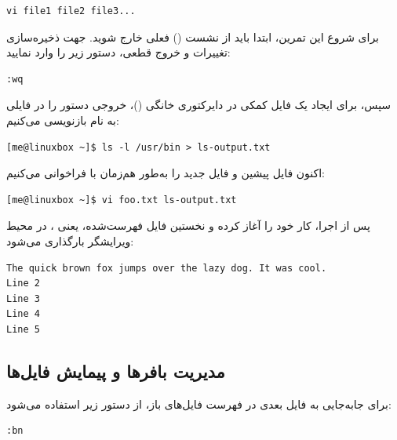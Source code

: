 \begin{latin}
\begin{lstlisting}
vi file1 file2 file3...
\end{lstlisting}
\end{latin}

برای شروع این تمرین، ابتدا باید از نشست () فعلی  خارج شوید. جهت ذخیره‌سازی تغییرات و خروج قطعی، دستور زیر را وارد نمایید:

\begin{latin}
\begin{lstlisting}
:wq
\end{lstlisting}
\end{latin}

سپس، برای ایجاد یک فایل کمکی در دایرکتوری خانگی ()، خروجی دستور  را در فایلی به نام  بازنویسی می‌کنیم:

\begin{latin}
\begin{lstlisting}
[me@linuxbox ~]$ ls -l /usr/bin > ls-output.txt
\end{lstlisting}
\end{latin}

اکنون فایل پیشین و فایل جدید را به‌طور هم‌زمان با  فراخوانی می‌کنیم:

\begin{latin}
\begin{lstlisting}
[me@linuxbox ~]$ vi foo.txt ls-output.txt
\end{lstlisting}
\end{latin}

پس از اجرا،  کار خود را آغاز کرده و نخستین فایل فهرست‌شده، یعنی ، در محیط ویرایشگر بارگذاری می‌شود:

\begin{latin}
\begin{lstlisting}
The quick brown fox jumps over the lazy dog. It was cool.
Line 2
Line 3
Line 4
Line 5
\end{lstlisting}
\end{latin}

\subsection{مدیریت بافرها و پیمایش فایل‌ها}

برای جابه‌جایی به فایل بعدی در فهرست فایل‌های باز، از دستور  زیر استفاده می‌شود:

\begin{latin}
\begin{lstlisting}
:bn
\end{lstlisting}
\end{latin}

